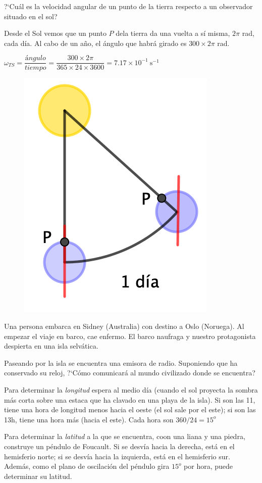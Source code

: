 \begin{prob}
?`Cuál es la velocidad angular de un punto de la tierra 	respecto a un observador situado en el sol?
\end{prob}

\begin{multicols}{2}
Desde el Sol vemos que un punto $P$ dela tierra da una vuelta a sí misma, $2\pi$ rad, cada día. Al cabo de un año, el ángulo que habrá girado es $300 \times 2\pi$ rad.

$\omega_{TS}=\dfrac{ángulo}{tiempo}=\dfrac{300 \times 2\pi}{365\times 24\times 3600}=7.17\times 10^{-1}\ \text{s}^{-1}$
\begin{figure}[H]
	\centering
	\includegraphics[width=.2\textwidth]{imagenes/imagenes10/T10IM16.png}
\end{figure}
\end{multicols}

\begin{prob}
Una persona embarca en Sidney (Australia) con destino a Oslo (Noruega). Al empezar el viaje en barco, cae enfermo. El barco naufraga y nuestro protagonista despierta en una isla selvática. 

Paseando por la isla se encuentra una emisora de radio. Suponiendo que ha conservado su reloj, ?`Cómo comunicará al mundo civilizado donde se encuentra?	
\end{prob}

Para determinar la \emph{longitud} espera al medio día (cuando el sol proyecta la sombra más corta sobre una estaca que ha clavado en una playa de la isla). Si son las 11, tiene una hora de longitud menos hacia el oeste (el sol sale por el este); si son las 13h, tiene una hora más (hacia el este). Cada hora son $360/24=15^o$


Para determinar la \emph{latitud} a la que se encuentra, coon una liana y una piedra, construye un péndulo de Foucault. Si se desvía hacia la derecha, está en el hemisferio norte; si se desvía hacia la izquierda, está en el hemisferio sur. Además, como el plano de oscilación del péndulo gira $15^o$ por hora, puede determinar su latitud.

